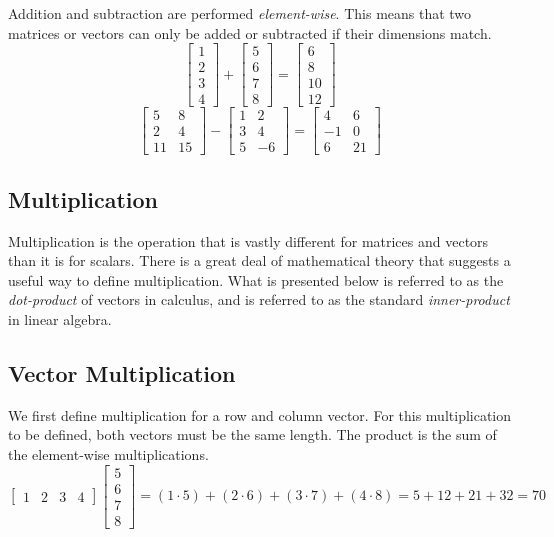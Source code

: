 \documentclass[]{book}
\theoremstyle{definition}
\theoremstyle{definition}
\theoremstyle{remark}
\begin{document}
Addition and subtraction are performed \emph{element-wise}. This means
that two matrices or vectors can only be added or subtracted if their
dimensions match. \[
\left[\begin{array}{c}
1\\
2\\
3\\
4
\end{array}\right]+\left[\begin{array}{c}
5\\
6\\
7\\
8
\end{array}\right]=\left[\begin{array}{c}
6\\
8\\
10\\
12
\end{array}\right]
\] \[
\left[\begin{array}{cc}
5 & 8\\
2 & 4\\
11 & 15
\end{array}\right]-\left[\begin{array}{cc}
1 & 2\\
3 & 4\\
5 & -6
\end{array}\right]=\left[\begin{array}{cc}
4 & 6\\
-1 & 0\\
6 & 21
\end{array}\right]
\]

\subsection{Multiplication}\label{multiplication}

Multiplication is the operation that is vastly different for matrices
and vectors than it is for scalars. There is a great deal of
mathematical theory that suggests a useful way to define multiplication.
What is presented below is referred to as the \emph{dot-product} of
vectors in calculus, and is referred to as the standard
\emph{inner-product} in linear algebra.

\subsection{Vector Multiplication}\label{vector-multiplication}

We first define multiplication for a row and column vector. For this
multiplication to be defined, both vectors must be the same length. The
product is the sum of the element-wise multiplications. \[
\left[\begin{array}{cccc}
1 & 2 & 3 & 4\end{array}\right]\left[\begin{array}{c}
5\\
6\\
7\\
8
\end{array}\right]=\left(1\cdot5\right)+\left(2\cdot6\right)+\left(3\cdot7\right)+\left(4\cdot8\right)=5+12+21+32=70
\]
\end{document}
